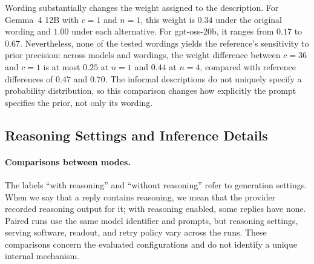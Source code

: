 \documentclass{article}
\theoremstyle{definition}
\begin{document}
Wording substantially changes the weight assigned to the description. For Gemma~4 12B with $c = 1$ and $n = 1$, this weight is $0.34$ under the original wording and $1.00$ under each alternative. For gpt-oss-20b, it ranges from $0.17$ to $0.67$. Nevertheless, none of the tested wordings yields the reference's sensitivity to prior precision: across models and wordings, the weight difference between $c = 36$ and $c = 1$ is at most $0.25$ at $n = 1$ and $0.44$ at $n = 4$, compared with reference differences of $0.47$ and $0.70$. The informal descriptions do not uniquely specify a probability distribution, so this comparison changes how explicitly the prompt specifies the prior, not only its wording.

\begin{table}[!htb]
\centering\footnotesize
\caption{\textbf{Description weights under four wordings without reasoning.} Weights are reported for the three relevant descriptions at $n = 1$ and $4$, using written readouts on the tasks of the $2{,}000$-task run. ``Number'' denotes the numeric response rate averaged over demonstration counts; a weight is italicized when the response rate at that count is below three quarters. The reference weights are $0.50$, $0.80$, and $0.97$ at $n = 1$, and $0.20$, $0.50$, and $0.90$ at $n = 4$. A fitted weight above $1$ means that, holding the sample mean fixed in the regression, a unit change in the prior mean corresponds to more than a unit change in the prediction. Wording changes overall reliance on the description, but the observed change with stated precision remains smaller than the reference change.}
\label{tab:paraphrase}
\vspace{3pt}

\end{table}

\subsection{Reasoning Settings and Inference Details}\label{app:reasoning-runs}

\paragraph{Comparisons between modes.}
The labels ``with reasoning'' and ``without reasoning'' refer to generation settings. When we say that a reply contains reasoning, we mean that the provider recorded reasoning output for it; with reasoning enabled, some replies have none. Paired runs use the same model identifier and prompts, but reasoning settings, serving software, readout, and retry policy vary across the runs. These comparisons concern the evaluated configurations and do not identify a unique internal mechanism.
\end{document}
